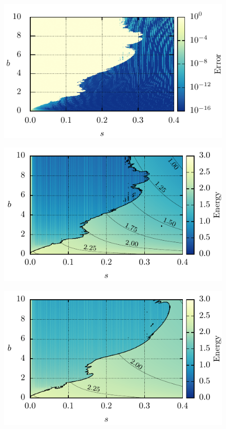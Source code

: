 \documentclass[10pt,twocolumn,a4paper]{article}
\begin{document}
\begin{figure}[tbp]
	\centering
	\includegraphics{ParamSpaceErr}
	\caption{}
	\label{fig:error}
\end{figure}

\begin{figure}[tbp]
	\centering
	\includegraphics{ParamSpaceEnergy}
	\caption{}
	\label{fig:}
\end{figure}



\begin{figure}[tbp]
	\centering
	\includegraphics{ParamSpaceEnergySwitch}
	\caption{}
	\label{fig:energyswitch}
\end{figure}
\end{document}

